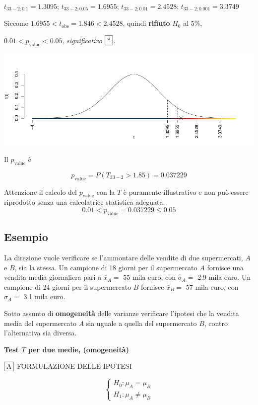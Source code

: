 \documentclass[
  11pt,
]{book}
\theoremstyle{mytheoremstyle}
\theoremstyle{mydefstyle}
\begin{document}
\(t_{33-2;0.1}=1.3095\); \(t_{33-2;0.05}=1.6955\); \(t_{33-2;0.01}=2.4528\); \(t_{33-2;0.001}=3.3749\)

Siccome \(1.6955<t_\text{obs}=1.846<2.4528\), quindi \textbf{rifiuto} \(H_0\) al 5\%,

\(0.01<p_\text{value}<0.05\), \emph{significativo} \(\fbox{*}\).

\begin{center}\includegraphics{Appunti_di_Statistica_2025_files/figure-latex/16-test-2C-1-1} \end{center}

Il \(p_{\text{value}}\) è

\[ p_{\text{value}} = P(T_{33-2}>1.85)=0.037229 \]

Attenzione il calcolo del \(p_\text{value}\) con la \(T\) è puramente illustrativo e non può essere riprodotto senza una calcolatrice statistica adeguata.\[
 0.01 < p_\text{value}= 0.037229 \leq 0.05 
\]

\subsection{Esempio}\label{esempio-4}

La direzione vuole verificare se l'ammontare delle vendite di due
supermercati, \(A\) e \(B\), sia la stessa. Un campione di 18 giorni per
il supermercato \(A\) fornisce una vendita media giornaliera pari a
\(\bar x_A=\) 55 mila euro, con \(\hat\sigma_A=\) 2.9 mila euro. Un campione di 24
giorni per il supermercato \(B\) fornisce \(\bar x_B=\) 57 mila euro, con
\(\hat\sigma_A=\) 3.1 mila euro.

Sotto assunto di \textbf{omogeneità} delle varianze
verificare l'ipotesi che la vendita media del supermercato \(A\) sia uguale a quella del supermercato \(B\), contro l'alternativa sia diversa.

\textbf{Test \(T\) per due medie, (omogeneità)}

\(\fbox{A}\) FORMULAZIONE DELLE IPOTESI

\[\begin{cases}
   H_0: \mu_\text{$A$} = \mu_\text{$B$} \\
   H_1: \mu_\text{$A$} \neq \mu_\text{$B$} 
   \end{cases}\]
\end{document}
